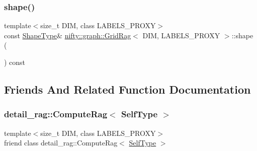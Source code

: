 \mbox{\label{classnifty_1_1graph_1_1GridRag_a63c46e4d01bf30e7366e5781a0f3de5f}} 
\subsubsection{\texorpdfstring{shape()}{shape()}}
{\footnotesize\ttfamily template$<$size\+\_\+t D\+IM, class L\+A\+B\+E\+L\+S\+\_\+\+P\+R\+O\+XY$>$ \\
const \hyperlink{classnifty_1_1graph_1_1GridRag_a3693e007e1419dec9751cca751a1061d}{Shape\+Type}\& \hyperlink{classnifty_1_1graph_1_1GridRag}{nifty\+::graph\+::\+Grid\+Rag}$<$ D\+IM, L\+A\+B\+E\+L\+S\+\_\+\+P\+R\+O\+XY $>$\+::shape (\begin{DoxyParamCaption}{ }\end{DoxyParamCaption}) const\hspace{0.3cm}{\ttfamily [inline]}}



\subsection{Friends And Related Function Documentation}
\mbox{\label{classnifty_1_1graph_1_1GridRag_abafcbd3543961eb6e4ee794aa6a62d66}} 
\subsubsection{\texorpdfstring{detail\+\_\+rag\+::\+Compute\+Rag$<$ Self\+Type $>$}{detail\_rag::ComputeRag< SelfType >}}
{\footnotesize\ttfamily template$<$size\+\_\+t D\+IM, class L\+A\+B\+E\+L\+S\+\_\+\+P\+R\+O\+XY$>$ \\
friend class detail\+\_\+rag\+::\+Compute\+Rag$<$ \hyperlink{classnifty_1_1graph_1_1GridRag_aa5e47cff6ae70d13254abc3382b3b166}{Self\+Type} $>$\hspace{0.3cm}{\ttfamily [friend]}}



